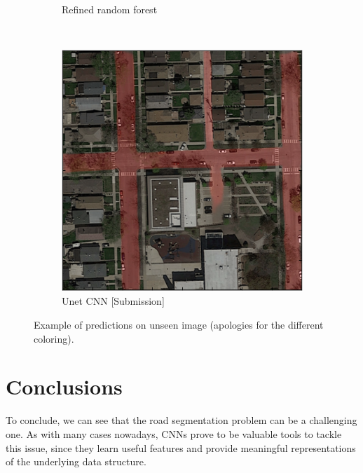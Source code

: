 \documentclass[10pt,conference,compsocconf]{IEEEtran}
\begin{document}
\begin{figure}[!h]
\begin{subfigure}[b]{0.12\textwidth}
		\caption{Refined random forest}
	\end{subfigure}
	~ %
	\begin{subfigure}[b]{0.12\textwidth}
		\includegraphics[width=\textwidth]{unet2.png}
		\caption{Unet CNN [Submission]}
	\end{subfigure}
	\caption{Example of predictions on unseen image (apologies for the different coloring).}\label{example_all}
\end{figure}
\section{Conclusions}
To conclude, we can see that the road segmentation problem can be a challenging one. As with many cases nowadays, CNNs prove to be valuable tools to tackle this issue, since they learn useful features and provide meaningful representations of the underlying data structure.
	
	
\end{document}
